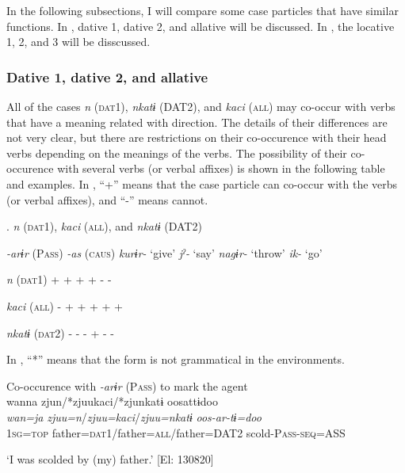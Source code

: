 \begin{table}
In the following subsections, I will compare some case particles that have similar functions. In , dative 1, dative 2, and allative will be discussed. In , the locative 1, 2, and 3 will be disscussed.

\subsubsection{Dative 1, dative 2, and allative}

All of the cases \textit{n} (\textsc{dat}1), \textit{nkatɨ} (DAT2), and \textit{kaci} (\textsc{all}) may co-occur with verbs that have a meaning related with direction. The details of their differences are not very clear, but there are restrictions on their co-occurence with their head verbs depending on the meanings of the verbs. The possibility of their co-occurence with several verbs (or verbal affixes) is shown in the following table and examples. In , “+” means that the case particle can co-occur with the verbs (or verbal affixes), and “-” means cannot.

\caption{\label{tab:key:42}\textmd{.} \textmd{\textit{n}}\textmd{ (\textsc{dat}1),} \textmd{\textit{kaci}}\textmd{ (\textsc{all}), and} \textmd{\textit{nkatɨ}}\textmd{ (DAT2)}}


    \textit{-arɨr} (P\textsc{ass})  \textit{-as} (\textsc{caus})  \textit{kurɨr-} ‘give’  \textit{jˀ-} ‘say’  \textit{nagɨr-} ‘throw’  \textit{ik-} ‘go’

\textit{n}  (\textsc{dat}1)  +  +  +  +  -  -

\textit{kaci}  (\textsc{all})  -  +  +  +  +  +

\textit{nkatɨ}  (\textsc{dat}2)  -  -  -  +  -  -

In , “*” means that the form is not grammatical in the environments.

\ea\label{ex:6-82}
\ea Co-occurence with \textit{-arɨr} (P\textsc{ass}) to mark the agent\\

{\TM}
\glll wanna  zjun/*zjuukaci/*zjunkatɨ  oosattɨdoo\\
\textit{wan=ja}  \textit{zjuu=n}/\textit{zjuu=kaci}/\textit{zjuu=nkatɨ}  \textit{oos-ar-tɨ=doo}\\

    1\textsc{sg}=\textsc{top}  father=\textsc{dat}1/father=\textsc{all}/father=DAT2  scold-P\textsc{ass}-\textsc{seq}=ASS

\glt    ‘I was scolded by (my) father.’ [El: 130820]


\end{table}
